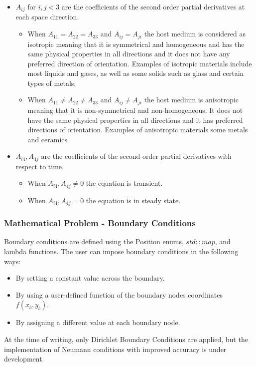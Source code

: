 \documentclass{article}
\begin{document}
	
	
	\begin{itemize}
		\item $A_{ij}$ for $i,j<3$ are the coefficients of the second order partial derivatives at each space direction. 
		
		\begin{itemize}
			\item When $A_{11}=A_{22}=A_{33}$ and $A_{ij}=A_{ji}$ the host medium is considered as isotropic meaning that it is symmetrical and homogeneous and has the same physical properties in all directions and it does not have any preferred direction of orientation. Examples of isotropic materials include most liquids and gases, as well as some solids such as glass and certain types of metals.
			
			\item When $A_{11} \neq A_{22} \neq A_{33}$ and $A_{ij}\neq A_{ji}$ the host medium is  anisotropic meaning that it is non-symmetrical and non-homogeneous. It does not have the same physical properties in all directions and it has preferred directions of orientation. Examples of anisotropic materials some metals and ceramics
		\end{itemize}
		
		\item $A_{i4},A_{4j}$ are the coefficients of the second order partial derivatives with respect to time.
		\begin{itemize}
			\item When $A_{i4},A_{4j} \neq 0$ the equation is transient. 
			\item When $A_{i4},A_{4j} = 0$ the equation is in steady state. 
		\end{itemize}
	\end{itemize}
	
	\subsubsection{Mathematical Problem - Boundary Conditions}
	Boundary conditions are defined using the Position enums, $std::map$, and lambda functions. The user can impose boundary conditions in the following ways:
	\begin{itemize}
		\item By setting a constant value across the boundary.
		\item By using a user-defined function of the boundary nodes coordinates $f(x_b, y_b)$.
		\item By assigning a different value at each boundary node.
	\end{itemize}
	At the time of writing, only Dirichlet Boundary Conditions are applied, but the implementation of Neumann conditions with improved accuracy is under development.
	
\end{document}
